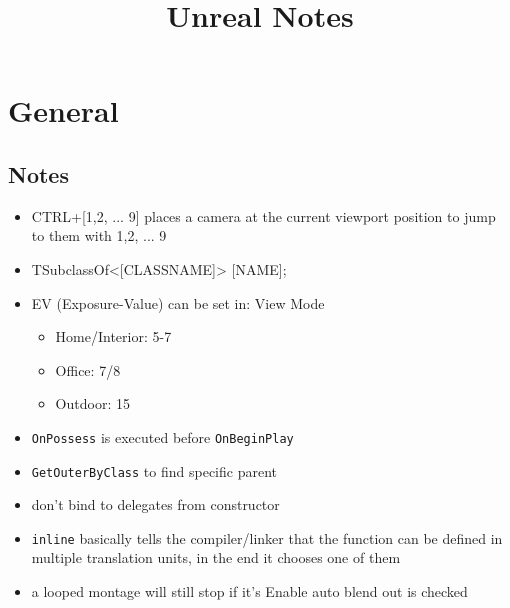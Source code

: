 \documentclass{scrbook}
\author{}
\title{Unreal Notes}
\newcommand{\code}[1]{\colorbox{mygray}{\lstinline|#1|}}
\begin{document}

\maketitle
{
  \hypersetup{linkcolor=black}
  \tableofcontents
}

    \chapter{General}
        \section{Notes}
        \begin{itemize}
            \item CTRL+[{1,2, ... 9}] places a camera at the current viewport position to jump to them with {1,2, ... 9}
            \item TSubclassOf<[CLASSNAME]> [NAME];
            \item EV (Exposure-Value) can be set in: View Mode
            \begin{itemize}
                \item Home/Interior: 5-7
                \item Office: 7/8
                \item Outdoor: 15
            \end{itemize}
            \item \code{OnPossess} is executed before \code{OnBeginPlay}
            \item \code{GetOuterByClass} to find specific parent
            \item don't bind to delegates from constructor
            \item \code{inline} basically tells the compiler/linker that the function can be defined in multiple translation units, in the end it chooses one of them
            \item a looped montage will still stop if it’s Enable auto blend out is checked
        \end{itemize}
\end{document}
